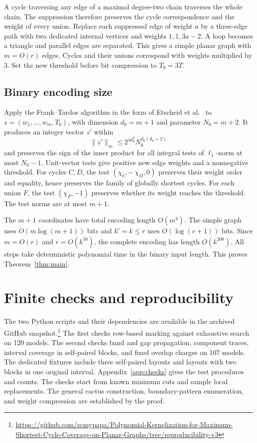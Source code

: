 \documentclass[10pt,letterpaper]{article}
\begin{document}
A cycle traversing any edge of a maximal degree-two chain traverses the whole chain. The suppression therefore preserves the cycle correspondence and the weight of every union. Replace each suppressed edge of weight \(a\) by a three-edge path with two dedicated internal vertices and weights \(1,1,3a-2\). A loop becomes a triangle and parallel edges are separated. This gives a simple planar graph with \(m=O(r)\) edges. Cycles and their unions correspond with weights multiplied by \(3\). Set the new threshold before bit compression to \(T_0=3T\).

\subsection{Binary encoding size}
Apply the Frank--Tardos algorithm in the form of Etscheid et al.\ \cite{Etscheid2017} to \(z=(w_1,\ldots,w_m,T_0)\), with dimension \(d_0=m+1\) and parameter \(N_0=m+2\). It produces an integer vector \(z'\) within
\[
 \|z'\|_\infty\le 2^{4d_0^3}N_0^{d_0(d_0+2)}
\]
and preserves the sign of the inner product for all integral tests of \(\ell_1\)-norm at most \(N_0-1\). Unit-vector tests give positive new edge weights and a nonnegative threshold. For cycles \(C,D\), the test \((\chi_C-\chi_D,0)\) preserves their weight order and equality, hence preserves the family of globally shortest cycles. For each union \(F\), the test \((\chi_F,-1)\) preserves whether its weight reaches the threshold. The test norms are at most \(m+1\).

The \(m+1\) coordinates have total encoding length \(O(m^4)\). The simple graph uses \(O(m\log(m+1))\) bits and \(k'=k\le r\) uses \(O(\log(r+1))\) bits. Since \(m=O(r)\) and \(r=O(k^{50})\), the complete encoding has length \(O(k^{200})\). All steps take deterministic polynomial time in the binary input length. This proves Theorem~\ref{thm:main}.

\section{Finite checks and reproducibility}\label{sec:checks}
The two Python scripts and their dependencies are available in the archived GitHub snapshot.\footnote{\raggedright\url{https://github.com/scmypapa/Polynomial-Kernelization-for-Maximum-Shortest-Cycle-Coverage-on-Planar-Graphs/tree/reproducibility-v3}} The first checks row-based marking against exhaustive search on 120 models. The second checks band and gap propagation, component traces, interval coverage in self-paired blocks, and fixed overlap charges on 107 models. The dedicated fixtures include three self-paired layouts and layouts with two blocks in one original interval. Appendix~\ref{app:checks} gives the test procedures and counts. The checks start from known minimum cuts and sample local replacements. The general cactus construction, boundary-pattern enumeration, and weight compression are established by the proof.
\end{document}
